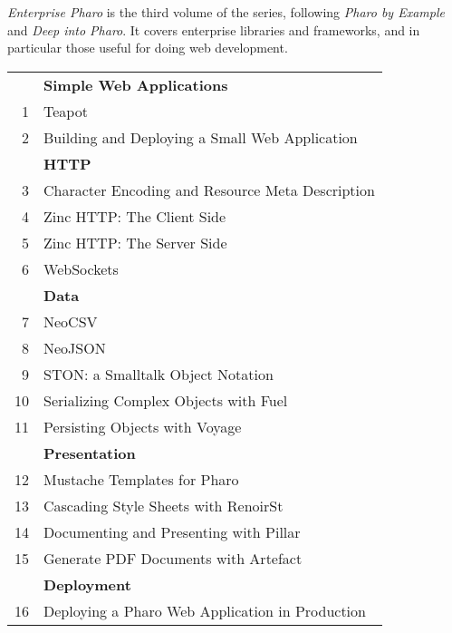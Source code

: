\documentclass[11pt,english]{../support/latex/sbabook/sbabook}
\begin{document}
\sffamily
\pagestyle{titlingpage}
\thispagestyle{titlingpage} %

\emph{Enterprise Pharo} is the third volume of the series, following
\emph{Pharo by Example} and \emph{Deep into Pharo}. It covers
enterprise libraries and frameworks, and in particular those useful
for doing web development.

\begin{tabular}{@{\quad}r@{\quad}l@{}}
   & \textbf{Simple Web Applications}                 \\
1  & Teapot                                           \\
2  & Building and Deploying a Small Web Application   \\[\smallskipamount]
   & \textbf{HTTP}                                    \\
3  & Character Encoding and Resource Meta Description \\
4  & Zinc HTTP: The Client Side                       \\
5  & Zinc HTTP: The Server Side                       \\
6  & WebSockets                                       \\[\smallskipamount]
   & \textbf{Data}                                    \\
7  & NeoCSV                         \\
8  & NeoJSON                                             \\
9  & STON: a Smalltalk Object Notation                \\
10 & Serializing Complex Objects with Fuel            \\
11 & Persisting Objects with Voyage                   \\[\smallskipamount]
   & \textbf{Presentation}                            \\
12 & Mustache Templates for Pharo                     \\
13 & Cascading Style Sheets with RenoirSt             \\
14 & Documenting and Presenting with Pillar           \\
15 & Generate PDF Documents with Artefact             \\[\smallskipamount]
   & \textbf{Deployment}                              \\
16 & Deploying a Pharo Web Application in Production  \\

\end{tabular}
\end{document}
